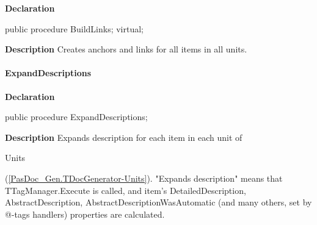 \documentclass{report}
\newif\ifpdf
\begin{document}
\label{PasDoc_Gen.TDocGenerator-BuildLinks}
\begin{list}{}{
\setlength{\itemindent}{0cm}
\setlength{\listparindent}{0cm}
\setlength{\leftmargin}{\evensidemargin}
\addtolength{\leftmargin}{\tmplength}
\settowidth{\labelsep}{X}
\addtolength{\leftmargin}{\labelsep}
\setlength{\labelwidth}{\tmplength}
}
\item[\textbf{Declaration}\hfill]
\ifpdf
\begin{flushleft}
\fi
\begin{ttfamily}
public procedure BuildLinks; virtual;\end{ttfamily}

\ifpdf
\end{flushleft}
\fi

\par
\item[\textbf{Description}]
Creates anchors and links for all items in all units.

\end{list}
\paragraph*{ExpandDescriptions}\hspace*{\fill}

\label{PasDoc_Gen.TDocGenerator-ExpandDescriptions}
\begin{list}{}{
\setlength{\itemindent}{0cm}
\setlength{\listparindent}{0cm}
\setlength{\leftmargin}{\evensidemargin}
\addtolength{\leftmargin}{\tmplength}
\settowidth{\labelsep}{X}
\addtolength{\leftmargin}{\labelsep}
\setlength{\labelwidth}{\tmplength}
}
\item[\textbf{Declaration}\hfill]
\ifpdf
\begin{flushleft}
\fi
\begin{ttfamily}
public procedure ExpandDescriptions;\end{ttfamily}

\ifpdf
\end{flushleft}
\fi

\par
\item[\textbf{Description}]
Expands description for each item in each unit of \begin{ttfamily}Units\end{ttfamily}(\ref{PasDoc_Gen.TDocGenerator-Units}). "Expands description" means that TTagManager.Execute is called, and item's DetailedDescription, AbstractDescription, AbstractDescriptionWasAutomatic (and many others, set by @{-}tags handlers) properties are calculated.

\end{list}
\end{document}
